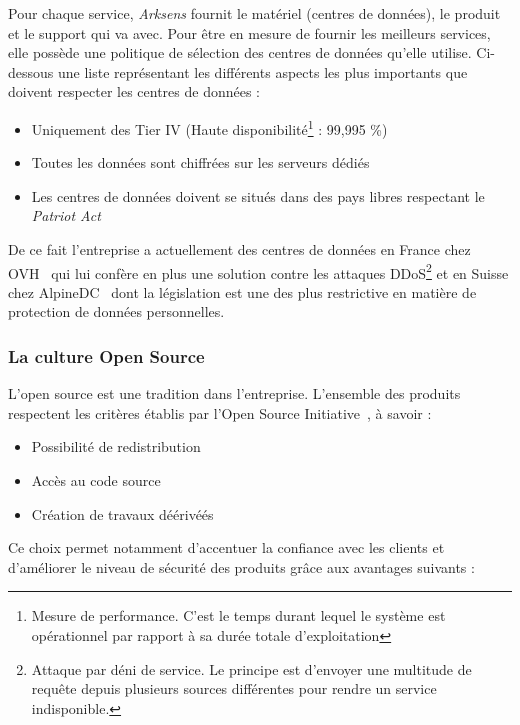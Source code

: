\documentclass[a4paper,10pt, twoside]{report}
\begin{document}
\begin{spacing}{1.2}
Pour chaque service, \textit{Arksens} fournit le mat\'eriel (centres de
donn\'ees), le produit et le support qui va avec. Pour \^etre en mesure de
fournir les meilleurs services, elle poss\`ede une politique de s\'election des
centres de donn\'ees qu'elle utilise. Ci-dessous une liste repr\'esentant les
diff\'erents aspects les plus importants que doivent respecter les centres de
donn\'ees :

\begin{itemize}
  \item Uniquement des Tier IV (Haute disponibilit\'e\footnote{Mesure de
  performance. C'est le temps durant lequel le syst\`eme est op\'erationnel par
  rapport \`a sa dur\'ee totale d'exploitation} : 99,995 \%)
  \item Toutes les données sont chiffr\'ees sur les serveurs d\'edi\'es
  \item Les centres de donn\'ees doivent se situés dans des pays libres
  respectant le \textit{Patriot Act}~\cite{refPatriotAct}
\end{itemize}

De ce fait l'entreprise a actuellement des centres de donn\'ees en France
chez OVH~\cite{refOVH} qui lui conf\`ere en plus une solution contre les
attaques DDoS\footnote{Attaque par d\'eni de service. Le principe est d'envoyer
une multitude de requ\^ete depuis plusieurs sources diff\'erentes pour rendre
un service indisponible.} et en Suisse chez AlpineDC~\cite{refAlpineDC} dont la
l\'egislation est une des plus restrictive en mati\`ere de protection de
donn\'ees personnelles.

\subsubsection{La culture Open Source}

L'open source est une tradition dans l'entreprise. L'ensemble des
produits respectent les crit\`eres \'etablis par l'Open Source
Initiative~\cite{refOSI}, \`a savoir :

\begin{itemize}
  \item Possibilit\'e de redistribution
  \item Accès au code source
  \item Cr\'eation de travaux d\'eériv\'eés
\end{itemize}

Ce choix permet notamment d'accentuer la confiance avec les clients et
d'am\'eliorer le niveau de s\'ecurit\'e des produits gr\^ace aux avantages
suivants :


\end{spacing}
\end{document}
